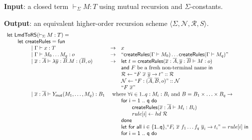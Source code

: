 \begin{table}[htbp]

{\bf Input}: a closed term $\vdash_\Sigma M : T$ using mutual recursion and  $\Sigma$-constants.

{\bf Output}: an equivalent higher-order recursion scheme $\langle \Sigma, \mathcal{N}, \mathcal{R}, S \rangle$.
$$\begin{array}{ll}
{\sf let\ LmdToRS}(\vdash_\Sigma M : T) =  \\
\qquad {\sf let\ createRules} = {\sf fun} \\
\qquad \qquad
    \begin{array}{lcl}
     |\ \Gamma \vdash x : T &\rightarrow& x \\
     |\ \Gamma \vdash M_0 \ldots M_q : o
      &\rightarrow&
        \mbox{``}{\sf createRules} (\Gamma \vdash M_0) \ldots {\sf createRules} (\Gamma \vdash M_q)\mbox{''}
      \\
     |\ \overline{x} : \overline{A} \vdash \lambda \overline{y}:\overline{B}. M : (\overline{B},o)
       &\rightarrow&
        {\sf let\ } t = {\sf createRules} (\overline{x}: \overline{A}, \overline{y}: \overline{B}\vdash M : o) \\
         && {\sf and \ } F \mbox{ be a fresh non-terminal name } {\sf in}\\
         &&\mathcal{R} \leftarrow \mbox{``}F\ \overline{x}\ \overline{y} \rightarrow t\mbox{''}::\mathcal{R} \\
         &&\mathcal{N} \leftarrow \mbox{``}F : (\overline{A},\overline{B},o)\mbox{''}::\mathcal{N} \\
         && \mbox{``}F\ \overline{x}\mbox{''}
     \\
      |\ \overline{x} : \overline{A} \vdash \ymut (M_1, \ldots, M_q):B_1 &\multicolumn{2}{l}{\mbox{ where } \forall i \in 1..q: M_i:B_i \mbox{ and } B=B_1 \times \ldots \times B_q \rightarrow} \\
     &&
     {\sf for\ i = 1\ ..\ q\ do} \\
     &&\qquad     {\sf createRules} (\overline{x}: \overline{A} \vdash M_i : B_i) \\
     &&\qquad     rule[i] \leftarrow hd\ \mathcal{R} \\
     &&{\sf done} \\
     &&{\sf let\ for\ all\ i\in\{1..q\}, } \mbox{``}F_i\ \overline{x}\ f_1 \ldots f_q\ \overline{y}_i \rightarrow t_i \mbox{''} = rule[i] {\sf\ in}\\
     &&{\sf for\ i = 1\ ..\ q\ do} \\

\end{array}
\end{array}$$
\end{table}
